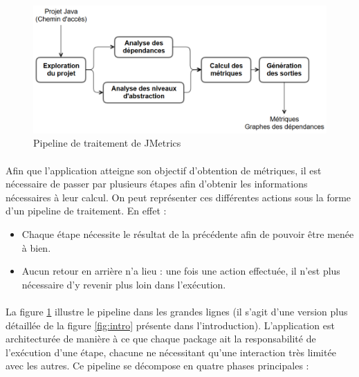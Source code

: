 \documentclass{scrartcl}
\begin{document}
\begin{figure}[ht]
    \centering
    \includegraphics[width=\textwidth]{img/pipeline_v2_visibility.png}
    \caption{Pipeline de traitement de JMetrics}
    \label{fig:simplepipe}
\end{figure}

    \paragraph{}Afin que l'application atteigne son objectif d'obtention de métriques, il est nécessaire de passer par plusieurs étapes afin d'obtenir les informations nécessaires à leur calcul. On peut représenter ces différentes actions sous la forme d'un pipeline de traitement. En effet :

\begin{itemize}
    \item Chaque étape nécessite le résultat de la précédente afin de pouvoir être menée à bien.
    \item Aucun retour en arrière n'a lieu : une fois une action effectuée, il n'est plus nécessaire d'y revenir plus loin dans l'exécution.
\end{itemize}

    \paragraph{}La figure \ref{fig:simplepipe} illustre le pipeline dans les grandes lignes (il s'agit d'une version plus détaillée de la figure \ref{fig:intro} présente dans l'introduction). L'application est architecturée de manière à ce que chaque package ait la responsabilité de l'exécution d'une étape, chacune ne nécessitant qu'une interaction très limitée avec les autres. Ce pipeline se décompose en quatre phases principales :
\end{document}
